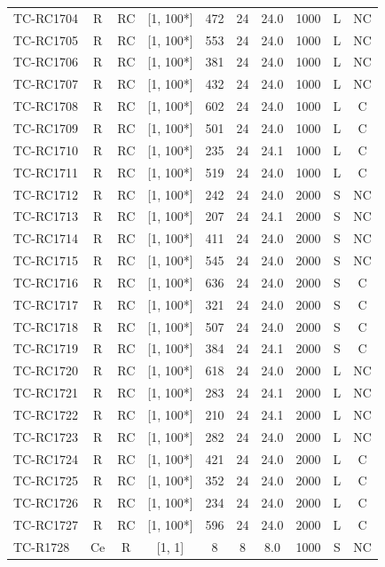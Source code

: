 \begin{longtable}{lccccccccc}
TC-RC1704 & R & RC & [1, 100*] & 472 & 24 & 24.0 & 1000 & L & NC \\
TC-RC1705 & R & RC & [1, 100*] & 553 & 24 & 24.0 & 1000 & L & NC \\
TC-RC1706 & R & RC & [1, 100*] & 381 & 24 & 24.0 & 1000 & L & NC \\
TC-RC1707 & R & RC & [1, 100*] & 432 & 24 & 24.0 & 1000 & L & NC \\
TC-RC1708 & R & RC & [1, 100*] & 602 & 24 & 24.0 & 1000 & L & C \\
TC-RC1709 & R & RC & [1, 100*] & 501 & 24 & 24.0 & 1000 & L & C \\
TC-RC1710 & R & RC & [1, 100*] & 235 & 24 & 24.1 & 1000 & L & C \\
TC-RC1711 & R & RC & [1, 100*] & 519 & 24 & 24.0 & 1000 & L & C \\
TC-RC1712 & R & RC & [1, 100*] & 242 & 24 & 24.0 & 2000 & S & NC \\
TC-RC1713 & R & RC & [1, 100*] & 207 & 24 & 24.1 & 2000 & S & NC \\
TC-RC1714 & R & RC & [1, 100*] & 411 & 24 & 24.0 & 2000 & S & NC \\
TC-RC1715 & R & RC & [1, 100*] & 545 & 24 & 24.0 & 2000 & S & NC \\
TC-RC1716 & R & RC & [1, 100*] & 636 & 24 & 24.0 & 2000 & S & C \\
TC-RC1717 & R & RC & [1, 100*] & 321 & 24 & 24.0 & 2000 & S & C \\
TC-RC1718 & R & RC & [1, 100*] & 507 & 24 & 24.0 & 2000 & S & C \\
TC-RC1719 & R & RC & [1, 100*] & 384 & 24 & 24.1 & 2000 & S & C \\
TC-RC1720 & R & RC & [1, 100*] & 618 & 24 & 24.0 & 2000 & L & NC \\
TC-RC1721 & R & RC & [1, 100*] & 283 & 24 & 24.1 & 2000 & L & NC \\
TC-RC1722 & R & RC & [1, 100*] & 210 & 24 & 24.1 & 2000 & L & NC \\
TC-RC1723 & R & RC & [1, 100*] & 282 & 24 & 24.0 & 2000 & L & NC \\
TC-RC1724 & R & RC & [1, 100*] & 421 & 24 & 24.0 & 2000 & L & C \\
TC-RC1725 & R & RC & [1, 100*] & 352 & 24 & 24.0 & 2000 & L & C \\
TC-RC1726 & R & RC & [1, 100*] & 234 & 24 & 24.0 & 2000 & L & C \\
TC-RC1727 & R & RC & [1, 100*] & 596 & 24 & 24.0 & 2000 & L & C \\
TC-R1728 & Ce & R & [1, 1] & 8 & 8 & 8.0 & 1000 & S & NC \\

\end{longtable}
